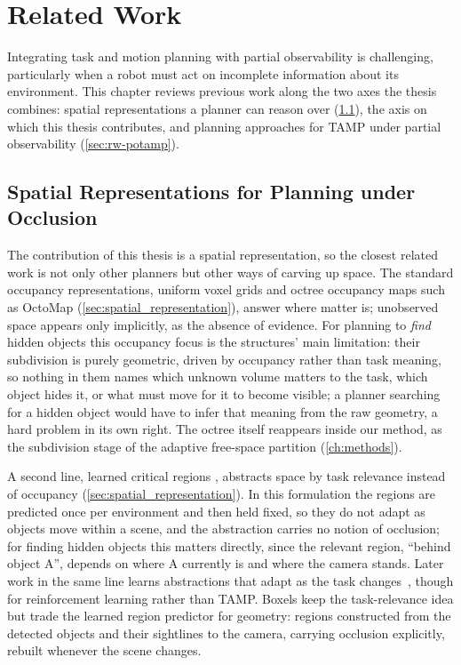 
\chapter{Related Work}
\label{ch:related-work}
Integrating task and motion planning with partial observability is challenging, particularly when a robot must act on incomplete information about its environment. This chapter reviews previous work along the two axes the thesis combines: spatial representations a planner can reason over (\cref{sec:rw-spatial}), the axis on which this thesis contributes, and planning approaches for TAMP under partial observability (\cref{sec:rw-potamp}).

\section{Spatial Representations for Planning under Occlusion}
\label{sec:rw-spatial}

The contribution of this thesis is a spatial representation, so the closest related work is not only other planners but other ways of carving up space. The standard occupancy representations, uniform voxel grids \cite{elfes1989occupancy} and octree occupancy maps such as OctoMap \cite{hornung2013octomap} (\cref{sec:spatial_representation}), answer where matter is; unobserved space appears only implicitly, as the absence of evidence. For planning to \emph{find} hidden objects this occupancy focus is the structures' main limitation: their subdivision is purely geometric, driven by occupancy rather than task meaning, so nothing in them names which unknown volume matters to the task, which object hides it, or what must move for it to become visible; a planner searching for a hidden object would have to infer that meaning from the raw geometry, a hard problem in its own right. The octree itself reappears inside our method, as the subdivision stage of the adaptive free-space partition (\cref{ch:methods}).

A second line, learned critical regions \cite{molina2020learn, shah2022abstractions}, abstracts space by task relevance instead of occupancy (\cref{sec:spatial_representation}). In this formulation the regions are predicted once per environment and then held fixed, so they do not adapt as objects move within a scene, and the abstraction carries no notion of occlusion; for finding hidden objects this matters directly, since the relevant region, ``behind object A'', depends on where A currently is and where the camera stands. Later work in the same line learns abstractions that adapt as the task changes~\cite{nayyar2025option}, though for reinforcement learning rather than TAMP. Boxels keep the task-relevance idea but trade the learned region predictor for geometry: regions constructed from the detected objects and their sightlines to the camera, carrying occlusion explicitly, rebuilt whenever the scene changes.

